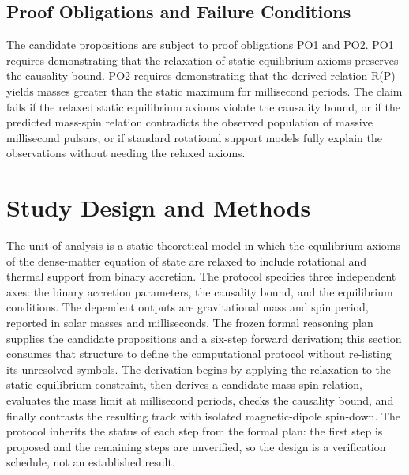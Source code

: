 \documentclass[conference]{IEEEtran}
\begin{document}
\subsection{Proof Obligations and Failure Conditions}
The candidate propositions are subject to proof obligations PO1 and PO2. PO1 requires demonstrating that the relaxation of static equilibrium axioms preserves the causality bound. PO2 requires demonstrating that the derived relation R(P) yields masses greater than the static maximum for millisecond periods. The claim fails if the relaxed static equilibrium axioms violate the causality bound, or if the predicted mass-spin relation contradicts the observed population of massive millisecond pulsars, or if standard rotational support models fully explain the observations without needing the relaxed axioms.

\section{Study Design and Methods}
The unit of analysis is a static theoretical model in which the equilibrium axioms of the dense-matter equation of state are relaxed to include rotational and thermal support from binary accretion. The protocol specifies three independent axes: the binary accretion parameters, the causality bound, and the equilibrium conditions. The dependent outputs are gravitational mass and spin period, reported in solar masses and milliseconds. The frozen formal reasoning plan supplies the candidate propositions and a six-step forward derivation; this section consumes that structure to define the computational protocol without re-listing its unresolved symbols. The derivation begins by applying the relaxation to the static equilibrium constraint, then derives a candidate mass-spin relation, evaluates the mass limit at millisecond periods, checks the causality bound, and finally contrasts the resulting track with isolated magnetic-dipole spin-down. The protocol inherits the status of each step from the formal plan: the first step is proposed and the remaining steps are unverified, so the design is a verification schedule, not an established result.~\cite{cite_55957f4ce67bd972}
\end{document}
